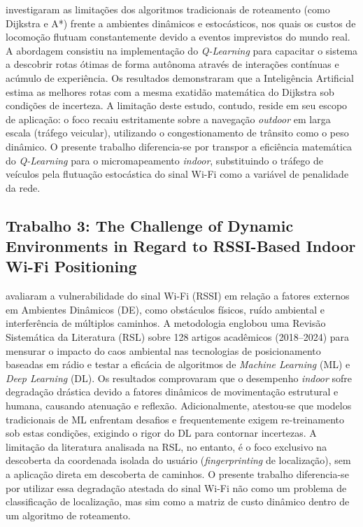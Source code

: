 \documentclass[
    12pt,                %
    openright,           %
    oneside,             %
    a4paper,             %
    english,             %
    brazil               %
]{abntex2}
\begin{document}
 investigaram as limitações dos algoritmos tradicionais de roteamento (como Dijkstra e A*) frente a ambientes dinâmicos e estocásticos, nos quais os custos de locomoção flutuam constantemente devido a eventos imprevistos do mundo real. A abordagem consistiu na implementação do \textit{Q-Learning} para capacitar o sistema a descobrir rotas ótimas de forma autônoma através de interações contínuas e acúmulo de experiência. Os resultados demonstraram que a Inteligência Artificial estima as melhores rotas com a mesma exatidão matemática do Dijkstra sob condições de incerteza. A limitação deste estudo, contudo, reside em seu escopo de aplicação: o foco recaiu estritamente sobre a navegação \textit{outdoor} em larga escala (tráfego veicular), utilizando o congestionamento de trânsito como o peso dinâmico. O presente trabalho diferencia-se por transpor a eficiência matemática do \textit{Q-Learning} para o micromapeamento \textit{indoor}, substituindo o tráfego de veículos pela flutuação estocástica do sinal Wi-Fi como a variável de penalidade da rede.

\subsection{Trabalho 3: The Challenge of Dynamic Environments in Regard to RSSI-Based Indoor Wi-Fi Positioning}

 avaliaram a vulnerabilidade do sinal Wi-Fi (RSSI) em relação a fatores externos em Ambientes Dinâmicos (DE), como obstáculos físicos, ruído ambiental e interferência de múltiplos caminhos. A metodologia englobou uma Revisão Sistemática da Literatura (RSL) sobre 128 artigos acadêmicos (2018--2024) para mensurar o impacto do caos ambiental nas tecnologias de posicionamento baseadas em rádio e testar a eficácia de algoritmos de \textit{Machine Learning} (ML) e \textit{Deep Learning} (DL). Os resultados comprovaram que o desempenho \textit{indoor} sofre degradação drástica devido a fatores dinâmicos de movimentação estrutural e humana, causando atenuação e reflexão. Adicionalmente, atestou-se que modelos tradicionais de ML enfrentam desafios e frequentemente exigem re-treinamento sob estas condições, exigindo o rigor do DL para contornar incertezas. A limitação da literatura analisada na RSL, no entanto, é o foco exclusivo na descoberta da coordenada isolada do usuário (\textit{fingerprinting} de localização), sem a aplicação direta em descoberta de caminhos. O presente trabalho diferencia-se por utilizar essa degradação atestada do sinal Wi-Fi não como um problema de classificação de localização, mas sim como a matriz de custo dinâmico dentro de um algoritmo de roteamento.
\end{document}
